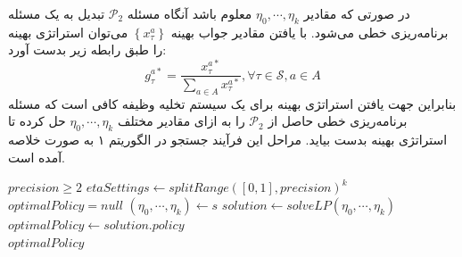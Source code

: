در صورتی که مقادیر
$\eta_0, \cdots, \eta_k$
معلوم باشد آنگاه مسئله
$\mathcal{P}_2$
تبدیل به یک مسئله برنامه‌ریزی خطی می‌شود. با یافتن مقادیر جواب بهینه
$\left\{x_{\tau}^{a}\right\}$ 
می‌توان استراتژی بهینه را طبق رابطه زیر بدست آورد:
\begin{equation}
	g_{\tau}^{a *}=\frac{x_{\tau}^{a *}}{\sum_{a \in A} x_{\tau}^{a *}}, \forall \tau \in \mathcal{S}, a \in A
\end{equation}
بنابراین جهت یافتن استراتژی بهینه برای یک سیستم تخلیه وظیفه کافی است که مسئله برنامه‌ریزی خطی حاصل از
$\mathcal{P}_2$
را به ازای مقادیر مختلف 
$\eta_0, \cdots, \eta_k$
حل کرده تا استراتژی بهینه بدست بیاید. مراحل این فرآیند جستجو در الگوریتم ۱ به صورت خلاصه آمده است.

\begin{latin}
	\begin{algorithm}
		\begin{algorithmic}[1]
			\Require $precision \geq 2$
			\State $etaSettings \gets splitRange([0, 1], precision)^k$
			\State $optimalPolicy = null$
				\State $(\eta_0, \cdots, \eta_k) \gets s$
				\State $solution \gets solveLP(\eta_0, \cdots, \eta_k)$
					\State $optimalPolicy \gets solution.policy$
				\EndIf
			\EndFor \\
			\Return $optimalPolicy$
		\end{algorithmic}
	\end{algorithm}
\end{latin}